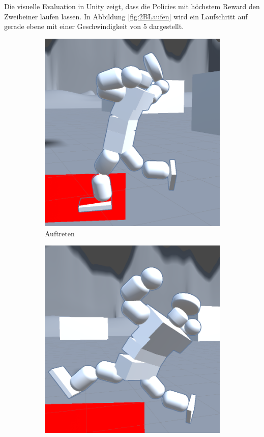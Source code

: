 Die visuelle Evaluation in Unity zeigt, dass die Policies mit höchstem Reward den Zweibeiner laufen lassen. In Abbildung \ref{fig:2BLaufen} wird ein Laufschritt auf gerade ebene mit einer Geschwindigkeit von $5$ dargestellt.
\begin{figure}
	\centering
	\begin{subfigure}[b]{0.3\textwidth}
		\centering
		\includegraphics[width=\textwidth]{resources/img/Unity1}
		\caption{Auftreten}
		\label{fig:Laufen1}
	\end{subfigure}
	\hfill
	\begin{subfigure}[b]{0.3\textwidth}
		\centering
		\includegraphics[width=\textwidth]{resources/img/Unity2}

\end{subfigure}
\end{figure}
